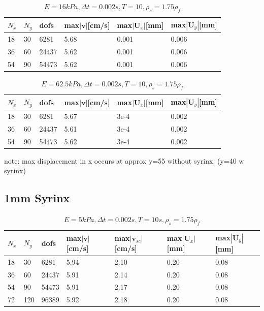\begin{table}[!h]
\begin{center}
  \begin{tabular}{l | l |  l | l | l | l }
    $N_x$ & $N_y$ & dofs & max$|\mathbf{v}|$[cm/s] & max$|\mathbf{U}_x|$[mm] & max$|\mathbf{U}_y|$[mm] \\ \hline
    18  & 30 & 6281 & 5.68 & 0.001 & 0.006 \\ \hline
	36  & 60 & 24437 & 5.62 & 0.001 & 0.006 \\ \hline
	54  & 90  & 54473 & 5.62 & 0.001 & 0.006 \\ \hline
    \hline
  \end{tabular}
  \end{center}
  \caption{$E = 16 kPa, \Delta t = 0.002s, T = 10, \rho_s = 1.75\rho_f$}
\end{table}
\begin{table}[!h]
\begin{center}
  \begin{tabular}{ l | l | l | l | l | l }
    $N_x$ & $N_y$ & dofs & max$|\mathbf{v}|$[cm/s] & max$|\mathbf{U}_x|$[mm] & max$|\mathbf{U}_y|$[mm] \\ \hline
    18  & 30 & 6281 & 5.67 & 3e-4 & 0.002 \\ \hline
	36  & 60 & 24437 & 5.61 & 3e-4 & 0.002 \\ \hline
	54  & 90 & 54473 & 5.62  & 3e-4 & 0.002  \\
    \hline
  \end{tabular}
  \end{center}
  \caption{$E = 62.5 kPa, \Delta t = 0.002s, T = 10, \rho_s = 1.75\rho_f$}
\end{table}
note: max displacement in x occurs at approx y=55 without syrinx. (y=40 w syrinx)
\clearpage
\subsection{1mm Syrinx}
\begin{table}[!h]
\begin{center}
  \begin{tabular}{l | l | l | l | l | l | l }
    $N_x$ & $N_y$ & dofs & max$|\mathbf{v}|$[cm/s] & max$|\mathbf{v}_{sc}|$[cm/s] & max$|\mathbf{U}_x|$[mm] & max$|\mathbf{U}_y|$[mm] \\ \hline
    18  & 30 & 6281 & 5.94 & 2.10 & 0.20 & 0.08 \\ \hline
	36 & 60 & 24437 & 5.91 & 2.14 & 0.20 & 0.08 \\ \hline
	54 & 90 & 54473 & 5.91 & 2.17 & 0.20 &  0.08 \\ \hline
	72 & 120& 96389 & 5.92 & 2.18 & 0.20 & 0.08 \\ \hline
    \hline
  \end{tabular}
  \end{center}
  \caption{$E = 5 kPa, \Delta t = 0.002s, T = 10s, \rho_s = 1.75 \rho_f$}
\end{table}

